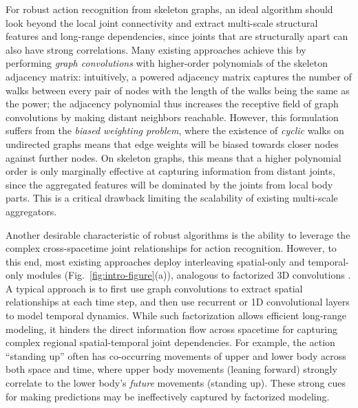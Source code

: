 \documentclass[10pt,twocolumn,letterpaper]{article}
\begin{document}
For robust action recognition from skeleton graphs, an ideal algorithm should look beyond the local joint connectivity and extract multi-scale structural features and long-range dependencies, since joints that are structurally apart can also have strong correlations.
Many existing approaches achieve this by performing \textit{graph convolutions} \cite{GCN} with higher-order polynomials of the skeleton adjacency matrix: intuitively, a powered adjacency matrix captures the number of walks between every pair of nodes with the length of the walks being the same as the power; the adjacency polynomial thus increases the receptive field of graph convolutions by making distant neighbors reachable.
However, this formulation suffers from the \textit{biased weighting problem}, where the existence of \textit{cyclic} walks on undirected graphs means that edge weights will be biased towards closer nodes against further nodes. On skeleton graphs, this means that a higher polynomial order is only marginally effective at capturing information from distant joints, since the aggregated features will be dominated by the joints from local body parts.
This is a critical drawback limiting the scalability of existing multi-scale aggregators.

Another desirable characteristic of robust algorithms is the ability to leverage the complex cross-spacetime joint relationships for action recognition.
However, to this end, most existing approaches \cite{ST-GCN, 2s-AGCN, st-gcn-concur-18, dgnn, AS-GCN-skeleton-cvpr19, attention-gcn-lstm-cvpr2019, st-graph-routing-skeleton-aaai19} deploy interleaving spatial-only and temporal-only modules (Fig.~\ref{fig:intro-figure}(a)), analogous to factorized 3D convolutions \cite{P3D, tran2018closer}.
A typical approach is to first use graph convolutions to extract spatial relationships at each time step, and then use recurrent \cite{st-gcn-concur-18, attention-gcn-lstm-cvpr2019, st-graph-routing-skeleton-aaai19} or 1D convolutional \cite{ST-GCN, 2s-AGCN, AS-GCN-skeleton-cvpr19, dgnn} layers to model temporal dynamics.
While such factorization allows efficient long-range modeling, it hinders the direct information flow across spacetime for capturing complex regional spatial-temporal joint dependencies.
For example, the action ``standing up'' often has co-occurring movements of upper and lower body across both space and time, where upper body movements (leaning forward) strongly correlate to the lower body's \textit{future} movements (standing up).
These strong cues for making predictions may be ineffectively captured by factorized modeling.
\end{document}
